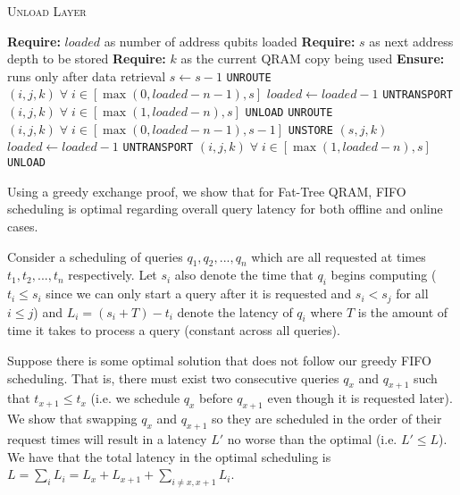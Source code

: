 \begin{algorithm}[t]
\caption{\textsc{Unload Layer}}\label{alg:unload}
\begin{algorithmic}[1]
    \State \textbf{Require: } $loaded$ as number of address qubits loaded
    \State \textbf{Require: }  $s$ as next address depth to be stored
    \State \textbf{Require: } $k$ as the current QRAM copy being used
    \State \textbf{Ensure: } runs only after data retrieval
    \newline
    \State $s \leftarrow s - 1$
    \Parallel
        \State \texttt{UNROUTE} $(i, j, k)   \; \forall \;i \in [\max(0, loaded - n - 1), s]$
    \EndParallel
    \newline
    \State $loaded \leftarrow loaded - 1$
    \Parallel
        \State \texttt{UNTRANSPORT} $(i, j, k) \; \forall \;i \in [\max(1, loaded - n), s]$
            \State \texttt{UNLOAD}
        \EndIf
    \EndParallel
    \newline
    \Parallel
        \State \texttt{UNROUTE} $(i, j, k) \; \forall \;i \in [\max(0, loaded - n - 1), s - 1]$
        \State \texttt{UNSTORE} $(s, j, k)$
    \EndParallel
    \newline
    \State $loaded \leftarrow loaded - 1$
    \Parallel
        \State \texttt{UNTRANSPORT} $(i, j, k) \; \forall \;i \in [\max(1, loaded - n), s]$
            \State \texttt{UNLOAD}
        \EndIf
    \EndParallel
\end{algorithmic}
\end{algorithm}

Using a greedy exchange proof, we show that for Fat-Tree QRAM, FIFO scheduling is optimal regarding overall query latency for both offline and online cases.

Consider a scheduling of queries $q_1, q_2, ..., q_n$ which are all requested at times $t_1, t_2, ..., t_n$ respectively. Let $s_i$ also denote the time that $q_i$ begins computing ($t_i \leq s_i$ since we can only start a query after it is requested and $s_i < s_j$ for all $i \leq j$) and $L_i = (s_i + T) - t_i$ denote the latency of $q_i$ where $T$ is the amount of time it takes to process a query (constant across all queries).

Suppose there is some optimal solution that does not follow our greedy FIFO scheduling. That is, there must exist two consecutive queries $q_x$ and $q_{x + 1}$ such that $t_{x + 1} \leq t_x$ (i.e. we schedule $q_x$ before $q_{x + 1}$ even though it is requested later). We show that swapping $q_x$ and $q_{x + 1}$ so they are scheduled in the order of their request times will result in a latency $L'$ no worse than the optimal (i.e. $L' \leq L$). We have that the total latency in the optimal scheduling is $L = \sum_{i} L_i = L_x + L_{x + 1} + \sum_{i \neq x, x + 1} L_i$.

